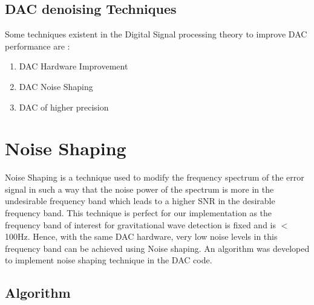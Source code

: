 \documentclass[a4paper,12pt]{article}
\begin{document}
    \subsection{DAC denoising Techniques}
    Some techniques existent in the Digital Signal processing theory to improve DAC performance are :
    
    		\begin{enumerate}
    			\item DAC Hardware Improvement
    			\item DAC Noise Shaping
    			\item DAC of higher precision
    		\end{enumerate}
\section{Noise Shaping}
\label{dacdenoising}
	Noise Shaping is a technique used to modify the frequency spectrum of the error signal in such a way that the noise power of the spectrum is more in the undesirable frequency band which leads to a higher SNR in the desirable frequency band. This technique is perfect for our implementation as the frequency band of interest for gravitational wave detection is fixed and is $<$ 100Hz. Hence, with the same DAC hardware, very low noise levels in this frequency band can be achieved using Noise shaping. An algorithm was developed to implement noise shaping technique in the DAC code. 

    \subsection{Algorithm}
\end{document}
